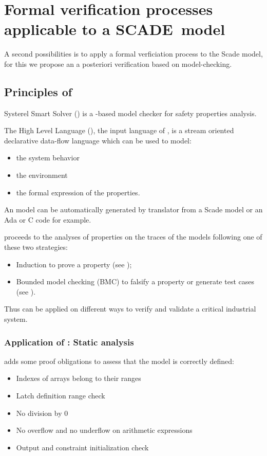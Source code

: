 \section{Formal verification processes applicable to a SCADE~model}

A second possibilities is to apply a formal verficiation process to  the Scade model, for this we propose an a posteriori verification based on model-checking.



\subsection{Principles of \smartsolver{}}

Systerel Smart Solver (\smartsolver{}) is a  \SAT{}-based
model checker for safety properties analysis. 

The High Level Language (\HLL{}), the input language of \smartsolver{}, is a stream oriented declarative data-flow language which can be used to  model:

\begin{itemize}
\item the system behavior
\item the environment
\item the formal expression of the properties.
\end{itemize}

An \HLL{} model can be automatically generated by translator from a Scade model or an Ada or C code for example.

\smartsolver{} proceeds to  the analyses of properties on the traces of the \HLL{} models following one of these two strategies:
\begin{itemize}
\item Induction to prove a property (see \cite{Sheeran:2000});
\item Bounded model checking (BMC) to falsify a property or generate test cases (see \cite{Biere:1999,Amla:2005}).
\end{itemize}

Thus \smartsolver{} can be applied on different ways to  verify and validate a critical industrial  system.


\subsubsection{Application of \smartsolver{}: Static analysis}
\label{sec:static-analysis}

\smartsolver{} adds some proof obligations to assess that the \HLL{}
model is correctly defined:
\begin{itemize}
\item Indexes of arrays belong to their ranges
\item Latch definition range check
\item No division by 0
\item No overflow and no underflow on arithmetic expressions
\item Output and constraint initialization check
\end{itemize}

